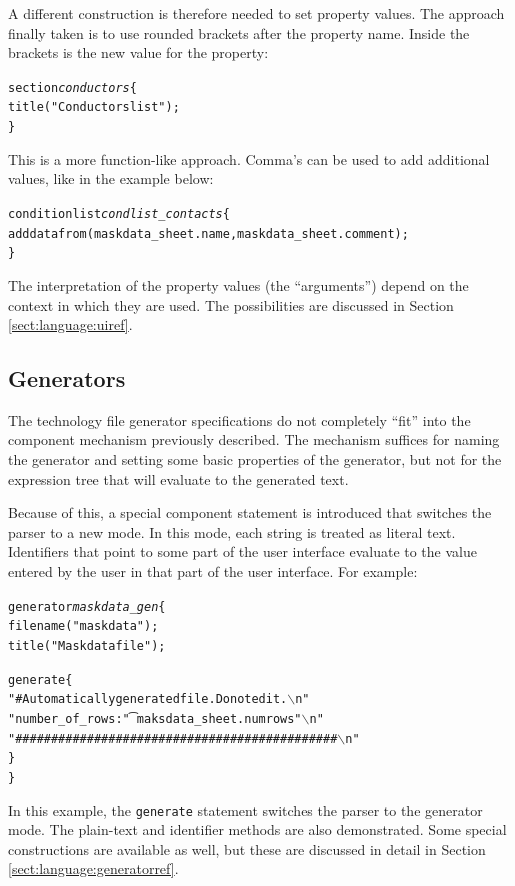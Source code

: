 A different construction is therefore needed to set property values. The
approach finally taken is to use rounded brackets after the property name.
Inside the brackets is the new value for the property:
\begin{alltt}
section \emph{conductors} \{
    title("Conductors list");
\}
\end{alltt}
This is a more function-like approach. Comma's can be used to add additional
values, like in the example below:
\begin{alltt}
conditionlist \emph{condlist_contacts} \{
    adddatafrom(maskdata_sheet.name, maskdata_sheet.comment);
\}
\end{alltt}
The interpretation of the property values (the ``arguments'') depend on the
context in which they are used. The possibilities are discussed in Section
\ref{sect:language:uiref}.

\subsection{Generators} \label{sect:language:generators_intro}
The technology file generator specifications do not completely ``fit'' into the component mechanism
previously described. The mechanism suffices for naming the generator and setting some
basic properties of the generator, but not for the expression tree that will
evaluate to the generated text.

Because of this, a special component statement is introduced that switches the
parser to a new mode. In this mode, each string is treated as literal text.
Identifiers that point to some part of the user interface evaluate to the value
entered by the user in that part of the user interface. For example:
\begin{alltt}
generator \emph{maskdata_gen} \{
    filename("maskdata");
    title("Maskdata file");

    generate \{
        "# Automatically generated file. Do not edit.\(\backslash\)n"
        "number_of_rows:\t" maksdata_sheet.numrows "\(\backslash\)n"
        "#############################################\(\backslash\)n"
    \}
\}
\end{alltt}
In this example, the \verb=generate= statement switches the parser to the
generator mode. The plain-text and identifier methods are also demonstrated.
Some special constructions are available as well, but these are discussed in
detail in Section \ref{sect:language:generatorref}.


